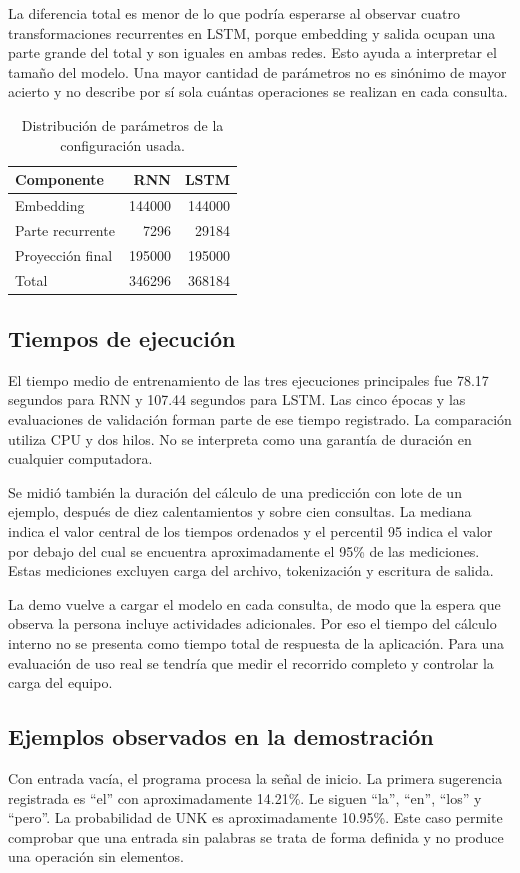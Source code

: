 La diferencia total es menor de lo que podría esperarse al observar cuatro transformaciones recurrentes en LSTM, porque embedding y salida ocupan una parte grande del total y son iguales en ambas redes. Esto ayuda a interpretar el tamaño del modelo. Una mayor cantidad de parámetros no es sinónimo de mayor acierto y no describe por sí sola cuántas operaciones se realizan en cada consulta.

\begin{table}[tb]
\caption{Distribución de parámetros de la configuración usada.}
\centering
\begin{tabular}{lrr}
\toprule Componente & RNN & LSTM\\\midrule
Embedding & 144000 & 144000\\
Parte recurrente & 7296 & 29184\\
Proyección final & 195000 & 195000\\\midrule
Total & 346296 & 368184\\\bottomrule
\end{tabular}
\end{table}

\subsection{Tiempos de ejecución}
El tiempo medio de entrenamiento de las tres ejecuciones principales fue 78.17 segundos para RNN y 107.44 segundos para LSTM. Las cinco épocas y las evaluaciones de validación forman parte de ese tiempo registrado. La comparación utiliza CPU y dos hilos. No se interpreta como una garantía de duración en cualquier computadora.

Se midió también la duración del cálculo de una predicción con lote de un ejemplo, después de diez calentamientos y sobre cien consultas. La mediana indica el valor central de los tiempos ordenados y el percentil 95 indica el valor por debajo del cual se encuentra aproximadamente el 95\% de las mediciones. Estas mediciones excluyen carga del archivo, tokenización y escritura de salida.

La demo vuelve a cargar el modelo en cada consulta, de modo que la espera que observa la persona incluye actividades adicionales. Por eso el tiempo del cálculo interno no se presenta como tiempo total de respuesta de la aplicación. Para una evaluación de uso real se tendría que medir el recorrido completo y controlar la carga del equipo.

\subsection{Ejemplos observados en la demostración}
Con entrada vacía, el programa procesa la señal de inicio. La primera sugerencia registrada es ``el'' con aproximadamente 14.21\%. Le siguen ``la'', ``en'', ``los'' y ``pero''. La probabilidad de UNK es aproximadamente 10.95\%. Este caso permite comprobar que una entrada sin palabras se trata de forma definida y no produce una operación sin elementos.

